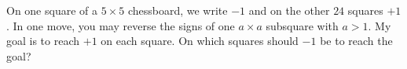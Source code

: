 On one square of a $5 \times 5$ chessboard, we write $-1$ and on the other $24$ squares $+1$. In one move, you may reverse the signs of one $a \times a$ subsquare with $a > 1$. My goal is to reach $+1$ on each square. On which squares should $-1$ be to reach the goal?
